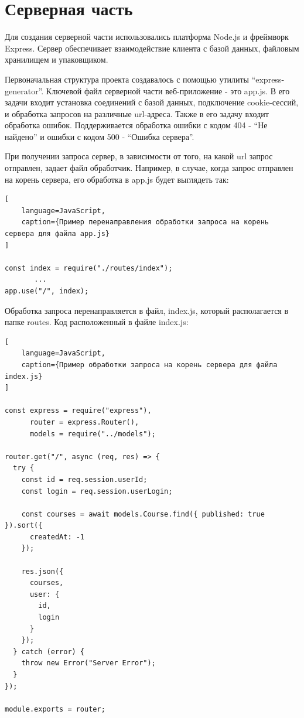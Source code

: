 \documentclass[%
  a5paper,
  subf,
  href,
  master,
  dotsinheaders 
]{csse-fcs}
\begin{document}
\section{Серверная часть}

Для создания серверной части использовались платформа Node.js и фреймворк Express. Сервер обеспечивает взаимодействие клиента с базой данных, файловым хранилищем и упаковщиком.

Первоначальная структура проекта создавалось с помощью утилиты “express-generator”. Ключевой файл серверной части веб-приложение - это app.js. В его задачи входит установка соединений с базой данных, подключение cookie-сессий, и обработка запросов на различные url-адреса. Также в его задачу входит обработка ошибок. Поддерживается обработка ошибки с кодом 404 - “Не найдено” и ошибки с кодом 500 - “Ошибка сервера”.

При получении запроса сервер, в зависимости от того, на какой url запрос отправлен, задает файл обработчик. Например, в случае, когда запрос отправлен на корень сервера, его обработка в app.js будет выглядеть так:

\begin{lstlisting}[
    language=JavaScript,
    caption={Пример перенаправления обработки запроса на корень сервера для файла app.js}
]

const index = require("./routes/index");
       ...
app.use("/", index);

\end{lstlisting}

Обработка запроса перенаправляется в файл, index.js, который располагается в папке routes. Код расположенный в файле index.js:

\begin{lstlisting}[
    language=JavaScript,
    caption={Пример обработки запроса на корень сервера для файла index.js}
]

const express = require("express"),
      router = express.Router(),
      models = require("../models");

router.get("/", async (req, res) => {
  try {
    const id = req.session.userId;
    const login = req.session.userLogin;

    const courses = await models.Course.find({ published: true }).sort({
      createdAt: -1
    });

    res.json({
      courses,
      user: {
        id,
        login
      }
    });
  } catch (error) {
    throw new Error("Server Error");
  }
});

module.exports = router;

\end{lstlisting}
\end{document}
